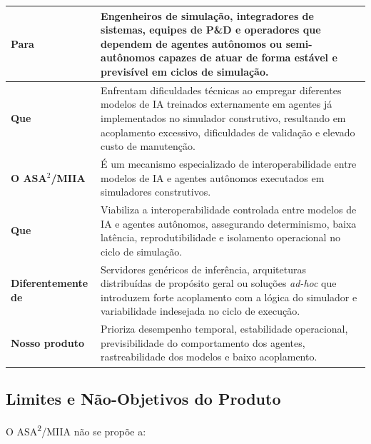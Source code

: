 \begin{table}[h]
    \begin{tabular}{|p{}|p{}|}
        \hline
            \textbf{Para} &
            Engenheiros de simulação, integradores de sistemas, equipes de P\&D e operadores que dependem de agentes autônomos ou semi-autônomos capazes de atuar de forma estável e previsível em ciclos de simulação. \\
        \hline
            \textbf{Que} &
            Enfrentam dificuldades técnicas ao empregar diferentes modelos de IA treinados externamente em agentes já implementados no simulador construtivo, resultando em acoplamento excessivo, dificuldades de validação e elevado custo de manutenção. \\
        \hline
            \textbf{O ASA$^{2}$/MIIA} &
            É um mecanismo especializado de interoperabilidade entre modelos de IA e agentes autônomos executados em simuladores construtivos. \\
        \hline
            \textbf{Que} &
            Viabiliza a interoperabilidade controlada entre modelos de IA e agentes autônomos, assegurando determinismo, baixa latência, reprodutibilidade e isolamento operacional no ciclo de simulação. \\
        \hline
            \textbf{Diferentemente de} &
            Servidores genéricos de inferência, arquiteturas distribuídas de propósito geral ou soluções \emph{ad-hoc} que introduzem forte acoplamento com a lógica do simulador e variabilidade indesejada no ciclo de execução. \\
        \hline
            \textbf{Nosso produto} &
           Prioriza desempenho temporal, estabilidade operacional, previsibilidade do comportamento dos agentes, rastreabilidade dos modelos e baixo acoplamento. \\
        \hline
    \end{tabular}
\end{table}

\subsection{Limites e Não-Objetivos do Produto}

O ASA\textsuperscript{2}/MIIA não se propõe a:

